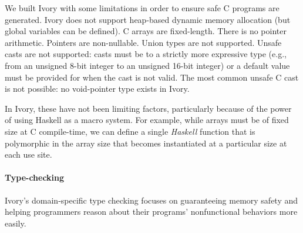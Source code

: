 We built Ivory with some limitations in order to  ensure safe C programs are
generated.  Ivory does not support heap-based dynamic memory allocation (but
global variables can be defined).  C arrays are fixed-length.  There is no
pointer arithmetic.  Pointers are non-nullable.  Union types are not supported.
Unsafe casts are not supported: casts must be to a strictly more expressive type
(e.g., from an unsigned 8-bit integer to an unsigned 16-bit integer) or a
default value must be provided for when the cast is not valid. The most common
unsafe C cast is not possible: no void-pointer type exists in Ivory.

In Ivory, these have not been limiting factors, particularly because of the
power of using Haskell as a macro system.  For example, while arrays must be of
fixed size at C compile-time, we can define a single \emph{Haskell} function
that is polymorphic in the array size that becomes instantiated at a particular
size at each use site.  %


\paragraph{Type-checking}
Ivory's domain-specific type checking focuses on guaranteeing memory
safety and helping programmers reason about their programs' nonfunctional
behaviors more easily.



